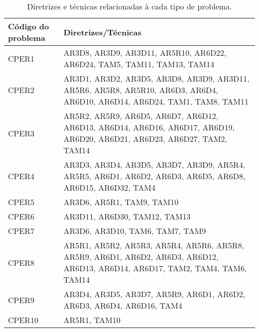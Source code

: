 \begin{table}[htb]
    \begin{center}
        \caption{Diretrizes e técnicas relacionadas à cada tipo de problema.}
        \label{tab-tec-pro-1}
        \begin{tabular}{p{2.0cm}|p{12.5cm}}
            \textbf{Código do problema} & \textbf{Diretrizes/Técnicas}                                                                                                  \\
            \hline
            CPER1                       & AR3D8, AR3D9, AR3D11, AR5R10, AR6D22, AR6D24, TAM5, TAM11, TAM13, TAM14                                                       \\
            \hline
            CPER2                       & AR3D1, AR3D2, AR3D5, AR3D8, AR3D9, AR3D11, AR5R6, AR5R8, AR5R10, AR6D3, AR6D4, AR6D10, AR6D14, AR6D24, TAM1, TAM8, TAM11      \\
            \hline
            CPER3                       & AR5R2, AR5R9, AR6D5, AR6D7, AR6D12, AR6D13, AR6D14, AR6D16, AR6D17, AR6D19, AR6D20, AR6D21, AR6D23, AR6D27, TAM2, TAM14       \\
            \hline
            CPER4                       & AR3D3, AR3D4, AR3D5, AR3D7, AR3D9, AR5R4, AR5R5, AR6D1, AR6D2, AR6D3, AR6D5, AR6D8, AR6D15, AR6D32, TAM4                      \\
            \hline
            CPER5                       & AR3D6, AR5R1, TAM9, TAM10                                                                                                     \\
            \hline
            CPER6                       & AR3D11, AR6D30, TAM12, TAM13                                                                                                  \\
            \hline
            CPER7                       & AR3D6, AR3D10, TAM6, TAM7, TAM9                                                                                               \\
            \hline
            CPER8                       & AR5R1, AR5R2, AR5R3, AR5R4, AR5R6, AR5R8, AR5R9, AR6D1, AR6D2, AR6D3, AR6D12, AR6D13, AR6D14, AR6D17, TAM2, TAM4, TAM6, TAM14 \\
            \hline
            CPER9                       & AR3D4, AR3D5, AR3D7, AR5R9, AR6D1, AR6D2, AR6D3, AR6D4, AR6D16, TAM4                                                          \\
            \hline
            CPER10                      & AR5R1, TAM10                                                                                                                  \\
        \end{tabular}
    \end{center}
\end{table}

